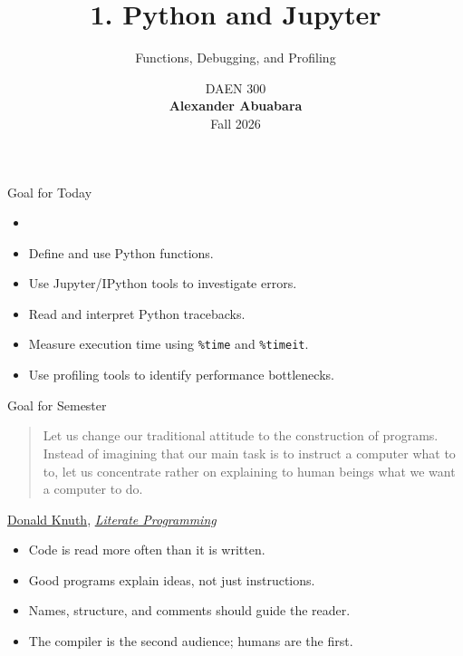 \documentclass[aspectratio=43,10pt]{beamer}
\title{1. Python and Jupyter}
\subtitle{Functions, Debugging, and Profiling}
\author{}
\date{%
  \textcolor{AggieMaroon}{
    DAEN 300\\
    \textbf{Alexander Abuabara}\\
    Fall 2026
  }
}
\begin{document}
\begin{frame}
  \titlepage
\end{frame}

\begin{frame}{Goal for Today}

\begin{itemize}
  \item 
  \item Define and use Python functions.
  \item Use Jupyter/IPython tools to investigate errors.
  \item Read and interpret Python tracebacks.
  \item Measure execution time using \texttt{\%time} and \texttt{\%timeit}.
  \item Use profiling tools to identify performance bottlenecks.
\end{itemize}

\end{frame}

\begin{frame}{Goal for Semester}
\large

\begin{quote}
Let us change our traditional attitude to the construction of programs.
Instead of imagining that our main task is to instruct a computer what to to,
let us concentrate rather on explaining to human beings what we want a computer to do.
\end{quote}

\hfill 
\href{https://en.wikipedia.org/wiki/Donald_Knuth}{Donald Knuth}, 
\href{https://en.wikipedia.org/wiki/Literate_programming}{\emph{Literate Programming}}

\vspace{0.6cm}

\begin{itemize}
  \item Code is read more often than it is written.
  \item Good programs explain ideas, not just instructions.
  \item Names, structure, and comments should guide the reader.
  \item The compiler is the second audience; humans are the first.
\end{itemize}

\end{frame}
\end{document}
